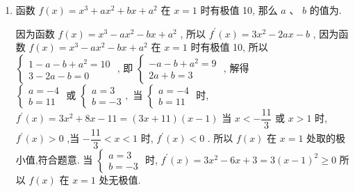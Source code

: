 \begin{enumerate}
    \item 函数 $f\left( x\right)  = {x}^{3} + a{x}^{2} + {bx} + {a}^{2}$ 在 $x = 1$ 时有极值 10, 那么 $a$ 、 $b$ 的值为.
    \begin{jieda}
        因为函数 $f\left( x\right)  = {x}^{3} - a{x}^{2} - {bx} + {a}^{2}$ ,
        所以 ${f}^{\prime }\left( x\right)  = 3{x}^{2} - {2ax} - b$ ,
        因为函数 $f\left( x\right)  = {x}^{3} - a{x}^{2} - {bx} + {a}^{2}$ 在 $x = 1$ 时有极值 10,
        所以 $\left\{  \begin{array}{l} 1 - a - b + {a}^{2} = {10} \\  3 - {2a} - b = 0 \end{array}\right.$ ,
        即 $\left\{  \begin{array}{l}  - a - b + a^2 = 9 \\  {2a} + b = 3 \end{array}\right.$ ,
        解得 $\left\{  {\begin{array}{l} a =  - 4 \\  b = {11} \end{array}\text{ 或 }\left\{  {\begin{array}{l} a = 3 \\  b =  - 3 \end{array},}\right. }\right.$
        当 $\left\{  \begin{array}{l} a =  - 4 \\  b = {11} \end{array}\right.$ 时, ${f}^{\prime }\left( x\right)  = 3{x}^{2} + {8x} - {11} = \left( {{3x} + {11}}\right) \left( {x - 1}\right)$
        当 $x <  - \dfrac{11}{3}$ 或 $x > 1$ 时, ${f}^{\prime }\left( x\right)  > 0$ ,当 $- \dfrac{11}{3} < x < 1$ 时, ${f}^{\prime }\left( x\right)  < 0$ .
        所以 $f\left( x\right)$ 在 $x = 1$ 处取的极小值,符合题意.
        当 $\left\{  \begin{array}{l} a = 3 \\  b =  - 3 \end{array}\right.$ 时, ${f}^{\prime }\left( x\right)  = 3{x}^{2} - {6x} + 3 = 3{\left( x - 1\right) }^{2} \geq  0$
        所以 $f\left( x\right)$ 在 $x = 1$ 处无极值.
    \end{jieda}



\end{enumerate}
